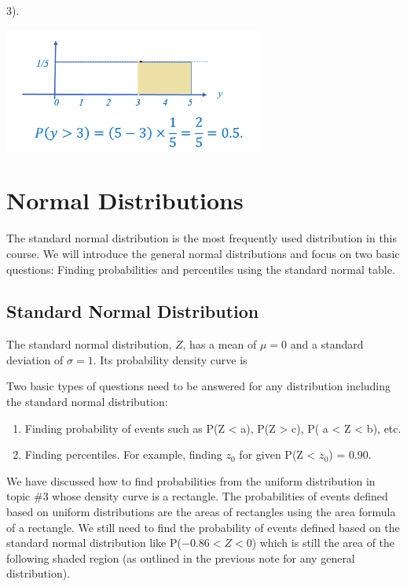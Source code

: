 \documentclass[
]{book}
\begin{document}
3).

\begin{center}\includegraphics[width=0.5\linewidth]{week03/uniformExample02-3} \end{center}

\hypertarget{normal-distributions}{%
\chapter{Normal Distributions}\label{normal-distributions}}

The standard normal distribution is the most frequently used distribution in this course. We will introduce the general normal distributions and focus on two basic questions: Finding probabilities and percentiles using the standard normal table.

\hfill\break

\hypertarget{standard-normal-distribution}{%
\section{Standard Normal Distribution}\label{standard-normal-distribution}}

The standard normal distribution, \(Z\), has a mean of \(\mu = 0\) and a standard deviation of \(\sigma = 1\). Its probability density curve is

Two basic types of questions need to be answered for any distribution including the standard normal distribution:

\begin{enumerate}
\def\labelenumi{\arabic{enumi}.}
\item
  Finding probability of events such as P(Z \textless{} a), P(Z \textgreater{} c), P( a \textless{} Z \textless{} b), etc.
\item
  Finding percentiles. For example, finding \(z_0\) for given P(Z \textless{} \(z_0\)) = 0.90.
\end{enumerate}

We have discussed how to find probabilities from the uniform distribution in topic \#3 whose density curve is a rectangle. The probabilities of events defined based on uniform distributions are the areas of rectangles using the area formula of a rectangle. We still need to find the probability of events defined based on the standard normal distribution like P(\(-0.86 < Z < 0\)) which is still the area of the following shaded region (as outlined in the previous note for any general distribution).
\end{document}
